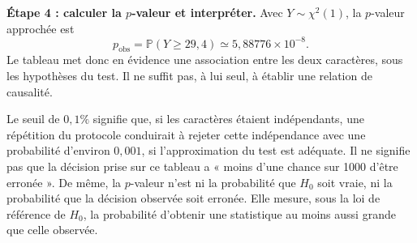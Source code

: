 {{\textbf{Étape 4 : calculer la $p$-valeur et interpréter.} Avec $Y\sim\chi^2(1)$, la $p$-valeur approchée est
\[
p_{\mathrm{obs}}=\mathbb P(Y\geq29{,}4)\simeq5{,}88776\times10^{-8}.
\]
Le tableau met donc en évidence une association entre les deux caractères, sous les hypothèses du test. Il ne suffit pas, à lui seul, à établir une relation de causalité.

Le seuil de $0{,}1\%$ signifie que, si les caractères étaient indépendants, une répétition du protocole conduirait à rejeter cette indépendance avec une probabilité d'environ $0{,}001$, si l'approximation du test est adéquate. Il ne signifie pas que la décision prise sur ce tableau a « moins d'une chance sur 1000 d'être erronée ».
De même, la $p$-valeur n'est ni la probabilité que $H_0$ soit vraie, ni la probabilité que la décision observée soit erronée. Elle mesure, sous la loi de référence de $H_0$, la probabilité d'obtenir une statistique au moins aussi grande que celle observée.
}
}
